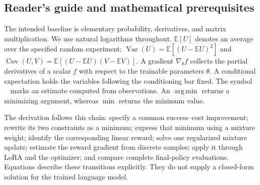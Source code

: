 \documentclass[11pt]{article}
\newcommand{\E}{\mathbb{E}}
\newcommand{\Var}{\operatorname{Var}}
\newcommand{\Cov}{\operatorname{Cov}}
\begin{document}
\subsection{Reader's guide and mathematical prerequisites}

The intended baseline is elementary probability, derivatives, and matrix multiplication. We use natural logarithms throughout. $\E[U]$ denotes an average over the specified random experiment; $\Var(U)=\E[(U-\E U)^2]$ and $\Cov(U,V)=\E[(U-\E U)(V-\E V)]$. A gradient $\nabla_\theta f$ collects the partial derivatives of a scalar $f$ with respect to the trainable parameters $\theta$. A conditional expectation holds the variables following the conditioning bar fixed. The symbol $\widehat{\phantom{u}}$ marks an estimate computed from observations. An $\operatorname*{arg\,min}$ returns a minimizing argument, whereas $\min$ returns the minimum value.

The derivation follows this chain: specify a common success--cost improvement; rewrite its two constraints as a minimum; express that minimum using a mixture weight; identify the corresponding linear reward; solve one regularized mixture update; estimate the reward gradient from discrete samples; apply it through LoRA and the optimizer; and compare complete final-policy evaluations. Equations describe these transitions explicitly. They do not supply a closed-form solution for the trained language model.
\end{document}
